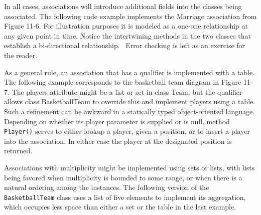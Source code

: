 In all cases, associations will introduce additional fields into the
classes being associated. The following code example implements the
Marriage association from Figure 11-6. For illustration purposes it is
modeled as a one-one relationship at any given point in time. Notice
the intertwining methods in the two classes that establish a
bi-directional relationship. \ Error checking is left as an exercise
for the reader.


As a general rule, an association that has a qualifier is implemented
with a table. The following example corresponds to
the basketball team diagram in Figure 11-7. The players attribute might
be a list or set in class Team, but the qualifier allows class
BasketballTeam to override this and implement players using a table.
Such a refinement can be awkward in a statically typed object-oriented
language.
Depending on whether its player parameter is supplied or is null, method
\texttt{Player()} serves to either lookup a player, given a position,
or to insert a player into the association. In either case the player
at the designated position is returned.


Associations with multiplicity might be implemented using sets or lists,
with lists being favored when multiplicity is bounded to some range, or
when there is a natural ordering among the instances. The following
version of the \texttt{BasketballTeam} class uses a list of five
elements to implement its aggregation, which occupies less space than
either a set or the table in the last example.

